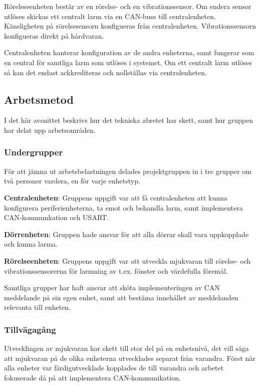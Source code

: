 \documentclass{article}
\begin{document}
Röreleseenheten består av en rörelse- och en vibrationssensor. Om endera sensor
utlöses skickas ett centralt larm via en CAN-buss till centralenheten. Känsligheten
på rörelsesensorn konfigueras från centralenheten. Vibrationssensorn konfigueras direkt på hårdvaran.

Centralenheten hanterar konfiguration av de andra enheterna, samt fungerar som en
central för samtliga larm som utlöses i systemet. Om ett centralt larm utlöses så
kan det endast ackkrediteras och nollställas via centralenheten.
\subsection{Arbetsmetod} %

I det här avsnittet beskrivs hur det tekniska abretet har skett, samt hur gruppen har delat upp arbetsområden.

\subsubsection{Undergrupper}
För att jämna ut arbetsbelastningen delades projektgruppen in i tre grupper om två personer vardera,
en för varje enhetstyp.

\textbf{Centralenheten}: Gruppens uppgift var att få centralenheten att kunna konfigurera
periferienheterna, ta emot och behandla larm, samt implementera CAN-kommunkation och USART.

\textbf{Dörrenheten}: Gruppen hade ansvar för att alla dörrar skall vara uppkopplade och kunna larma.

\textbf{Rörelseenheten}: Gruppens uppgift var att utveckla mjukvaran till
rörelse- och vibrationssensorerna för larmning av t.ex. fönster och värdefulla föremål.

Samtliga grupper har haft ansvar att sköta implementeringen av CAN meddelande på sin egen enhet, samt att bestäma innehållet av meddelanden relevanta till enheten.

\subsubsection{Tillvägagång}

Utvecklingen av mjukvaran har skett till stor del på en enhetsnivå, det vill säga att mjukvaran på de olika enheterna utvecklades separat från varandra. 
Först när alla enheter var färdigutvecklade kopplades de till varandra och arbetet fokuserade då på att implementera CAN-kommunikation.
\end{document}
